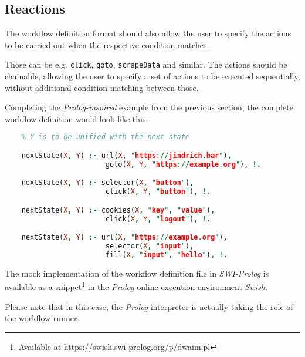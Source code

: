 \subsection{Reactions} \label{markov}

The workflow definition format should also allow the user to specify the actions to be carried out when the respective condition matches.

Those can be e.g. \texttt{click}, \texttt{goto}, \texttt{scrapeData} and similar. 
The actions should be chainable, allowing the user to specify a set of actions to be executed sequentially, without additional condition matching between those.

Completing the \textit{Prolog-inspired} example from the previous section, the complete workflow definition would look like this:

\begin{minipage}{0.95\linewidth}
\begin{lstlisting}[language=prolog, columns=spaceflexible]
    % X is denoting the current state of the browser
    % Y is to be unified with the next state

    nextState(X, Y) :- url(X, "https://jindrich.bar"),
                        goto(X, Y, "https://example.org"), !.

    nextState(X, Y) :- selector(X, "button"),
                        click(X, Y, "button"), !.

    nextState(X, Y) :- cookies(X, "key", "value"),
                        click(X, Y, "logout"), !.

    nextState(X, Y) :- url(X, "https://example.org"),
                        selector(X, "input"),
                        fill(X, "input", "hello"), !.

\end{lstlisting}
\end{minipage}

\emptyline

The mock implementation of the workflow definition file in \textit{SWI-Prolog} is available as a \href{https://swish.swi-prolog.org/p/dwaim.pl}{snippet}\footnote{Available at \url{https://swish.swi-prolog.org/p/dwaim.pl}} in the \textit{Prolog} online execution environment \textit{Swish}. 

Please note that in this case, the \textit{Prolog} interpreter is actually taking the role of the workflow runner.


